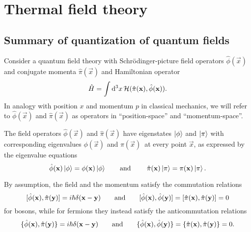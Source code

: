 \chapter{Thermal field theory}

\newcommand{\transampl}{\braket{\phi_B | e^{- i \hat{H} T / \hbar} | \phi_A}}

\section{Summary of quantization of quantum fields}


Consider a quantum field theory with Schrödinger-picture field operators $\hat{\phi}(\vec{x})$ and conjugate momenta $\hat{\pi}(\vec{x})$ and Hamiltonian operator
\begin{equation}
	\hat{H} = \int \mathop{}\!\mathrm{d}^3 x \, \mathcal{H}(\hat{\pi}(\mathbf{x}), \hat{\phi}(\mathbf{x})) .
\end{equation}
In analogy with position $x$ and momentum $p$ in classical mechanics, we will refer to $\hat\phi(\vec{x})$ and $\hat\pi(\vec{x})$ as operators in ``position-space'' and ``momentum-space''.

The field operators $\hat{\phi}(\vec{x})$ and $\hat{\pi}(\vec{x})$ have eigenstates $\ket{\phi}$ and $\ket{\pi}$ with corresponding eigenvalues $\phi(\vec{x})$ and $\pi(\vec{x})$ at every point $\vec{x}$, as expressed by the eigenvalue equations
\begin{equation}
	\hat{\phi}(\vec{x}) \ket{\phi} = \phi(\vec{x}) \ket{\phi}
	\qquad \text{and} \qquad
	\hat{\pi}(\vec{x}) \ket{\pi} = \pi(\vec{x}) \ket{\pi} .
\label{eq:tft:field_eigenvalue_equations}
\end{equation}

By assumption, the field and the momentum satisfy the commutation relations
\begin{equation}
	[ \hat{\phi}(\mathbf{x}) , \hat{\pi}(\mathbf{y}) ] = i \hbar \delta(\mathbf{x} - \mathbf{y})
	\qquad \text{and} \qquad
	[ \hat{\phi}(\mathbf{x}) , \hat{\phi}(\mathbf{y}) ] = 
	[ \hat{\pi}(\mathbf{x}) , \hat{\pi}(\mathbf{y)} ] = 
	0
\label{eq:tft:boson_field_commutators}
\end{equation}
for bosons, while for fermions they instead satisfy the anticommutation relations
\begin{equation}
	\{ \hat{\phi}(\mathbf{x}) , \hat{\pi}(\mathbf{y}) \} = i \hbar \delta(\mathbf{x} - \mathbf{y})
	\qquad \text{and} \qquad
	\{ \hat{\phi}(\mathbf{x}) , \hat{\phi}(\mathbf{y}) \} = 
	\{ \hat{\pi}(\mathbf{x}) , \hat{\pi}(\mathbf{y)} \} = 
	0 .
\label{eq:tft:fermion_field_anticommutators}
\end{equation}

